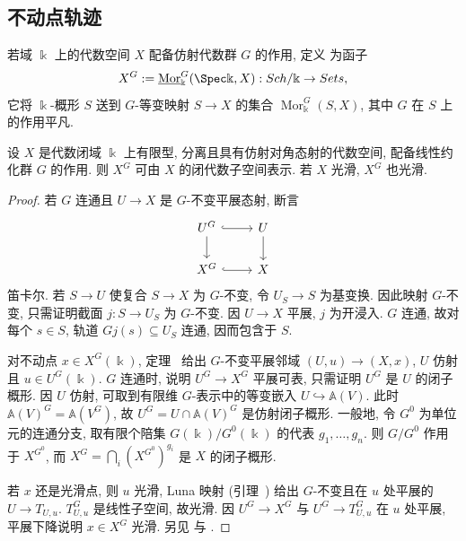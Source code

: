\subsection{不动点轨迹}\label{src:7.8.1-subsection}
\begin{definition}[不动点轨迹]\label{src:7.8.1}
若域 $\Bbbk$ 上的代数空间 $X$ 配备仿射代数群 $G$ 的作用, 定义 为函子
\begin{align*}
X^G:=\underline{\operatorname{Mor}}_{\Bbbk}^G(\Spec\Bbbk,X):\Sch/\Bbbk\to\Sets,
\end{align*}
它将 $\Bbbk$-概形 $S$ 送到 $G$-等变映射 $S\to X$ 的集合 $\operatorname{Mor}_{\Bbbk}^G(S,X)$, 其中 $G$ 在 $S$ 上的作用平凡.
\end{definition}
\begin{theorem}\label{src:7.8.2}
设 $X$ 是代数闭域 $\Bbbk$ 上有限型, 分离且具有仿射对角态射的代数空间, 配备线性约化群 $G$ 的作用. 则 $X^G$ 可由 $X$ 的闭代数子空间表示. 若 $X$ 光滑, $X^G$ 也光滑.
\end{theorem}
\begin{proof}
若 $G$ 连通且 $U\to X$ 是 $G$-不变平展态射, 断言
\begin{align}\label{src:7.8.3}
\begin{tikzcd}[ampersand replacement=\&]
U^G\arrow[r,hook]\arrow[d]\&U\arrow[d]\\
X^G\arrow[r,hook]\&X
\end{tikzcd}
\end{align}
笛卡尔. 若 $S\to U$ 使复合 $S\to X$ 为 $G$-不变, 令 $U_S\to S$ 为基变换. 因此映射 $G$-不变, 只需证明截面 $j:S\to U_S$ 为 $G$-不变. 因 $U\to X$ 平展, $j$ 为开浸入. $G$ 连通, 故对每个 $s\in S$, 轨道 $Gj(s)\subseteq U_S$ 连通, 因而包含于 $S$.

对不动点 $x\in X^G(\Bbbk)$, 定理~ 给出 $G$-不变平展邻域 $(U,u)\to(X,x)$, $U$ 仿射且 $u\in U^G(\Bbbk)$. $G$ 连通时,  说明 $U^G\to X^G$ 平展可表, 只需证明 $U^G$ 是 $U$ 的闭子概形. 因 $U$ 仿射, 可取到有限维 $G$-表示中的等变嵌入 $U\hookrightarrow\mathbb A(V)$. 此时 $\mathbb A(V)^G=\mathbb A(V^G)$, 故 $U^G=U\cap\mathbb A(V)^G$ 是仿射闭子概形. 一般地, 令 $G^0$ 为单位元的连通分支, 取有限个陪集 $G(\Bbbk)/G^0(\Bbbk)$ 的代表 $g_1,\ldots,g_n$. 则 $G/G^0$ 作用于 $X^{G^0}$, 而 $X^G=\bigcap_i(X^{G^0})^{g_i}$ 是 $X$ 的闭子概形.

若 $x$ 还是光滑点, 则 $u$ 光滑, Luna 映射 (引理~) 给出 $G$-不变且在 $u$ 处平展的 $U\to T_{U,u}$. $T_{U,u}^G$ 是线性子空间, 故光滑. 因 $U^G\to X^G$ 与 $U^G\to T_{U,u}^G$ 在 $u$ 处平展, 平展下降说明 $x\in X^G$ 光滑. 另见 \cite[命题 1.3]{Ive72} 与 \cite[定理 13.1]{Mil17}.
\end{proof}

